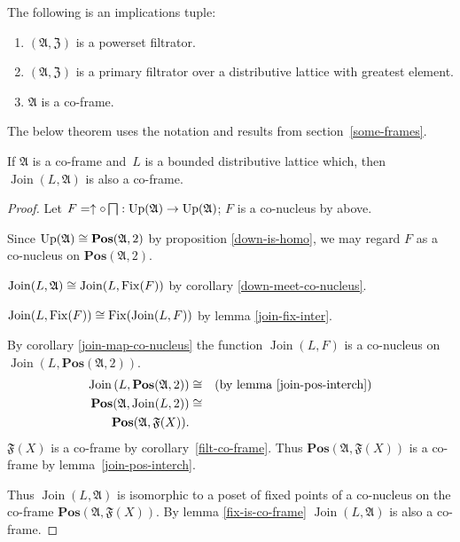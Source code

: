 \begin{cor}\label{filt-co-frame}
The following is an implications tuple:
\begin{enumerate}
\item $(\mathfrak{A},\mathfrak{Z})$ is a powerset filtrator.
\item $(\mathfrak{A},\mathfrak{Z})$ is a primary filtrator over a distributive lattice with greatest element.
\item $\mathfrak{A}$ is a co-frame.
\end{enumerate}
\end{cor}

The below theorem uses the notation and results from section~\ref{some-frames}.
\begin{thm}
\label{frame-main}If $\mathfrak{A}$ is a co-frame and~$L$ is a
bounded distributive lattice which,
then $\operatorname{Join}(L,\mathfrak{A})$
is also a co-frame.
\end{thm}
\begin{proof}
Let $F=\uparrow\circ\bigsqcap:\operatorname{Up}(\mathfrak{A})\rightarrow\operatorname{Up}(\mathfrak{A})$;
$F$ is a co-nucleus by above.

Since $\operatorname{Up}(\mathfrak{A})\cong\mathbf{Pos}(\mathfrak{A},2)$ by
proposition \ref{down-is-homo}, we may regard $F$ as a co-nucleus
on $\mathbf{Pos}(\mathfrak{A},2)$.

$\operatorname{Join}(L,\mathfrak{A})\cong\operatorname{Join}(L,\operatorname{Fix}(F))$
by corollary \ref{down-meet-co-nucleus}.

$\operatorname{Join}(L,\operatorname{Fix}(F))\cong\operatorname{Fix}(\operatorname{Join}(L,F))$
by lemma \ref{join-fix-inter}.

By corollary \ref{join-map-co-nucleus} the function $\operatorname{Join}(L,F)$
is a co-nucleus on $\operatorname{Join}\left(L,\mathbf{Pos}(\mathfrak{A},2)\right)$.
\begin{eqnarray*}
\operatorname{Join}\left(L,\mathbf{Pos}(\mathfrak{A},2)\right) & \cong & \text{(by lemma \ref{join-pos-interch})}\\
\mathbf{Pos}(\mathfrak{A},\operatorname{Join}(L,2)) & \cong\\
\mathbf{Pos}(\mathfrak{A},\mathfrak{F}(X)).
\end{eqnarray*}
$\mathfrak{F}(X)$ is a co-frame by corollary~\ref{filt-co-frame}. Thus
$\mathbf{Pos}(\mathfrak{A},\mathfrak{F}(X))$ is a co-frame by lemma~\ref{join-pos-interch}.

Thus $\operatorname{Join}(L,\mathfrak{A})$ is isomorphic to a poset
of fixed points of a co-nucleus on the co-frame $\mathbf{Pos}(\mathfrak{A},\mathfrak{F}(X))$.
By lemma \ref{fix-is-co-frame} $\operatorname{Join}(L,\mathfrak{A})$
is also a co-frame.
\end{proof}

